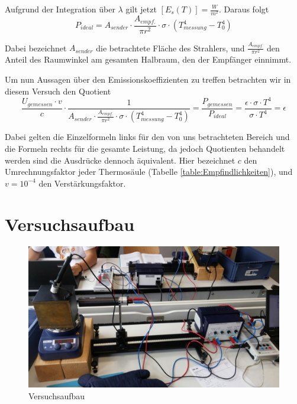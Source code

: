 \documentclass[a4paper, 11pt]{article}
\begin{document}
Aufgrund der Integration über $\lambda$ gilt jetzt $[E_s(T)]=\frac{W}{m^2}$. Daraus folgt
\begin{equation}
P_{ideal} = A_{sender}\cdot \frac{A_{empf.}}{\pi r^2} \cdot \sigma \cdot (T_{messung}^4-T_0^4)
\end{equation}

Dabei bezeichnet $A_{sender}$ die betrachtete Fläche des Strahlers, und
$\frac{A_{empf.}}{\pi r^2}$ den Anteil des Raumwinkel am gesamten Halbraum, den der Empfänger einnimmt.

Um nun Aussagen über den Emissionskoeffizienten zu treffen betrachten wir in diesem Versuch den Quotient 
\begin{equation} \label{eq:epsilon}
\frac{U_{gemessen} \cdot v}{c}\cdot \frac{1}{A_{sender}\cdot \frac{A_{empf.}}{\pi r^2} \cdot \sigma \cdot (T_{messung}^4-T_0^4)}=\frac{P_{gemessen}}{P_{ideal}}=\frac{\epsilon \cdot \sigma\cdot T^4}{\sigma \cdot T^4}=\epsilon
\end{equation}

Dabei gelten die Einzelformeln links für den von uns betrachteten Bereich und die Formeln rechts für die gesamte Leistung, da jedoch Quotienten behandelt werden sind die Ausdrücke dennoch äquivalent.
Hier bezeichnet $c$ den Umrechnungsfaktor jeder Thermosäule (Tabelle \ref{table:Empfindlichkeiten}), und $v=10^{-4}$ den Verstärkungsfaktor.

\newpage

\section{Versuchsaufbau}

\begin{figure}[H]
	\centering
	\includegraphics[scale=0.4]{Bilder/Aufbau.jpeg}
	\caption{Versuchsaufbau}
	\label{pic:Versuchsaufbau}
\end{figure}
\end{document}
